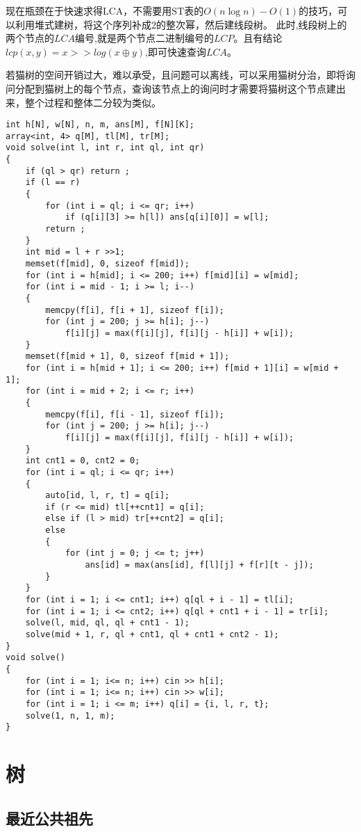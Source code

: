 \documentclass[a4paper, fontset=none]{ctexart}
\begin{document}
现在瓶颈在于快速求得$\text{LCA}$，不需要用$\text{ST}$表的$O(n\log n)-O(1)$的技巧，可以利用堆式建树，将这个序列补成$2$的整次幂，然后建线段树。
此时,线段树上的两个节点的$LCA$编号,就是两个节点二进制编号的$LCP$。且有结论$lcp(x, y)=x >> log(x\oplus y)$,即可快速查询$LCA$。

若猫树的空间开销过大，难以承受，且问题可以离线，可以采用猫树分治，即将询问分配到猫树上的每个节点，查询该节点上的询问时才需要将猫树这个节点建出来，整个过程和整体二分较为类似。
\begin{verbatim}
int h[N], w[N], n, m, ans[M], f[N][K];
array<int, 4> q[M], tl[M], tr[M];
void solve(int l, int r, int ql, int qr)
{
    if (ql > qr) return ;
    if (l == r)
    {
        for (int i = ql; i <= qr; i++)
            if (q[i][3] >= h[l]) ans[q[i][0]] = w[l];
        return ;
    }
    int mid = l + r >>1;
    memset(f[mid], 0, sizeof f[mid]);
    for (int i = h[mid]; i <= 200; i++) f[mid][i] = w[mid];
    for (int i = mid - 1; i >= l; i--)
    {
        memcpy(f[i], f[i + 1], sizeof f[i]);
        for (int j = 200; j >= h[i]; j--)
            f[i][j] = max(f[i][j], f[i][j - h[i]] + w[i]);
    }
    memset(f[mid + 1], 0, sizeof f[mid + 1]);
    for (int i = h[mid + 1]; i <= 200; i++) f[mid + 1][i] = w[mid + 1];
    for (int i = mid + 2; i <= r; i++)
    {
        memcpy(f[i], f[i - 1], sizeof f[i]);
        for (int j = 200; j >= h[i]; j--)
            f[i][j] = max(f[i][j], f[i][j - h[i]] + w[i]);
    }
    int cnt1 = 0, cnt2 = 0;
    for (int i = ql; i <= qr; i++)
    {
        auto[id, l, r, t] = q[i];
        if (r <= mid) tl[++cnt1] = q[i];
        else if (l > mid) tr[++cnt2] = q[i];
        else
        {
            for (int j = 0; j <= t; j++)
                ans[id] = max(ans[id], f[l][j] + f[r][t - j]);
        }
    }
    for (int i = 1; i <= cnt1; i++) q[ql + i - 1] = tl[i];
    for (int i = 1; i <= cnt2; i++) q[ql + cnt1 + i - 1] = tr[i];
    solve(l, mid, ql, ql + cnt1 - 1);
    solve(mid + 1, r, ql + cnt1, ql + cnt1 + cnt2 - 1);
}
void solve()
{
    for (int i = 1; i<= n; i++) cin >> h[i];
    for (int i = 1; i<= n; i++) cin >> w[i];
    for (int i = 1; i <= m; i++) q[i] = {i, l, r, t};
    solve(1, n, 1, m);
}
\end{verbatim}

\section{树}
\subsection{最近公共祖先}
\end{document}
